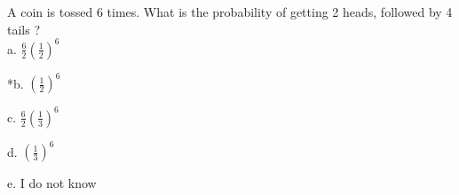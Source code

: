 
A coin is tossed 6 times. What is the probability of getting 2 heads,
followed by 4 tails ? \\

a. \(\frac{6}{2}(\frac{1}{2})^{6}\)

*b. \((\frac{1}{2})^{6}\)

c. \(\frac{6}{2}(\frac{1}{3})^{6}\)

d. \((\frac{1}{3})^{6}\)

e. I do not know \\
